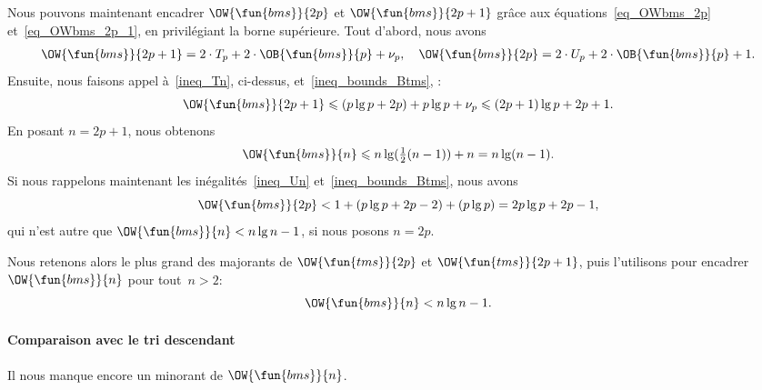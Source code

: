 Nous pouvons maintenant encadrer
\(\OW{\fun{bms}}{2p}\) et
\(\OW{\fun{bms}}{2p+1}\) grâce aux équations~\eqref{eq_OWbms_2p}
et~\eqref{eq_OWbms_2p_1}, en privilégiant la borne supérieure. Tout
d'abord, nous avons
\begin{align*}
\OW{\fun{bms}}{2p+1} = 2 \cdot T_p + 2 \cdot \OB{\fun{bms}}{p} +
\nu_p,
\quad
\OW{\fun{bms}}{2p} = 2 \cdot U_p + 2 \cdot \OB{\fun{bms}}{p} + 1.
\end{align*}
Ensuite, nous faisons appel à~\eqref{ineq_Tn}, ci-dessus,
et~\eqref{ineq_bounds_Btms}, :
\begin{equation*}
\OW{\fun{bms}}{2p+1}
  \leqslant (p\lg p + 2p) + p\lg p + \nu_p
   \leqslant (2p+1)\lg p + 2p + 1.
\end{equation*}
En posant \(n=2p+1\), nous obtenons
\begin{equation*}
\OW{\fun{bms}}{n}
  \leqslant n\lg(\tfrac{1}{2}(n-1)) + n = n\lg(n-1).
\end{equation*}
Si nous rappelons maintenant les inégalités~\eqref{ineq_Un}
et~\eqref{ineq_bounds_Btms}, nous avons
\begin{equation*}
\OW{\fun{bms}}{2p} < 1 + (p\lg p + 2p - 2) + (p\lg p)
             = 2p\lg p + 2p - 1,
\end{equation*}
qui n'est autre que \(\OW{\fun{bms}}{n} < n\lg n - 1\), si nous
posons \(n = 2p\).

Nous retenons alors le plus grand des majorants de
\(\OW{\fun{tms}}{2p}\) et \(\OW{\fun{tms}}{2p+1}\), puis l'utilisons
pour encadrer \(\OW{\fun{bms}}{n}\) pour tout~\(n > 2\):
\begin{equation}
\OW{\fun{bms}}{n} < n\lg n - 1.
\label{ineq_OWbms_up}
\end{equation}

\paragraph{Comparaison avec le tri descendant}

Il nous manque encore un minorant de \(\OW{\fun{bms}}{n}\). 

